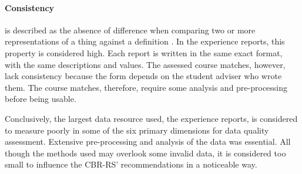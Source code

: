 \paragraph{Consistency} is described as the absence of difference when comparing two or more representations of a thing against a definition \cite{askham2013six}. In the experience reports, this property is considered high. Each report is written in the same exact format, with the same descriptions and values. The assessed course matches, however, lack consistency because the form depends on the student adviser who wrote them. The course matches, therefore, require some analysis and pre-processing before being usable. 

Conclusively, the largest data resource used, the experience reports, is considered to measure poorly in some of the six primary dimensions for data quality assessment. Extensive pre-processing and analysis of the data was essential. All though the methods used may overlook some invalid data, it is considered too small to influence the CBR-RS' recommendations in a noticeable way. 
\fi